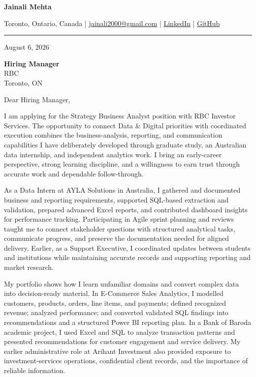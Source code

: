 \documentclass[letterpaper,10pt]{article}
\begin{document}
\begin{center}
  {\fontsize{17}{19}\selectfont\textbf{Jainali Mehta}}\par\vspace{2pt}
  \small Toronto, Ontario, Canada \;|\;
  \href{mailto:jainali2000@gmail.com}{jainali2000@gmail.com} \;|\;
  \href{https://www.linkedin.com/in/jainali-mehta}{LinkedIn} \;|\;
  \href{https://github.com/jainalimehta}{GitHub}
\end{center}
\vspace{-5pt}
\noindent\rule{\textwidth}{0.4pt}

August 6, 2026

\textbf{Hiring Manager}\\
RBC\\
Toronto, ON

Dear Hiring Manager,

I am applying for the Strategy Business Analyst position with RBC Investor Services. The opportunity to connect Data \& Digital priorities with coordinated execution combines the business-analysis, reporting, and communication capabilities I have deliberately developed through graduate study, an Australian data internship, and independent analytics work. I bring an early-career perspective, strong learning discipline, and a willingness to earn trust through accurate work and dependable follow-through.

As a Data Intern at AYLA Solutions in Australia, I gathered and documented business and reporting requirements, supported SQL-based extraction and validation, prepared advanced Excel reports, and contributed dashboard insights for performance tracking. Participating in Agile sprint planning and reviews taught me to connect stakeholder questions with structured analytical tasks, communicate progress, and preserve the documentation needed for aligned delivery. Earlier, as a Support Executive, I coordinated updates between students and institutions while maintaining accurate records and supporting reporting and market research.

My portfolio shows how I learn unfamiliar domains and convert complex data into decision-ready material. In E-Commerce Sales Analytics, I modelled customers, products, orders, line items, and payments; defined recognized revenue; analyzed performance; and converted validated SQL findings into recommendations and a structured Power BI reporting plan. In a Bank of Baroda academic project, I used Excel and SQL to analyze transaction patterns and presented recommendations for customer engagement and service delivery. My earlier administrative role at Arihant Investment also provided exposure to investment-services operations, confidential client records, and the importance of reliable information.
\end{document}
